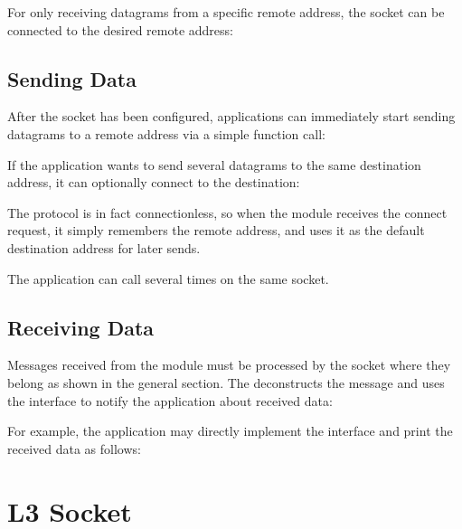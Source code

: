 For only receiving  datagrams from a specific remote address, the
socket can be connected to the desired remote address:


\subsection*{Sending Data}

After the socket has been configured, applications can immediately start sending
 datagrams to a remote address via a simple function call:


If the application wants to send several  datagrams to the same
destination address, it can optionally connect to the destination:


The  protocol is in fact connectionless, so when the
 module receives the connect request, it simply remembers the
remote address, and uses it as the default destination address for later sends.

The application can call  several times on the same socket.

\subsection*{Receiving Data}

Messages received from the  module must be processed by the socket
where they belong as shown in the general section. The 
deconstructs the message and uses the  interface
to notify the application about received data:


For example, the application may directly implement the
 interface and print the received data as
follows:


\section{L3 Socket}

